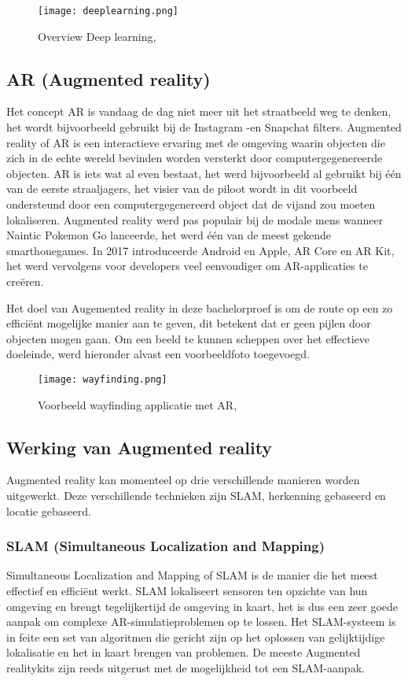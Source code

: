 \begin{figure}[H]
	\centering
	\texttt{[image: deeplearning.png]}
	\caption{Overview Deep learning, \autocite{ObjRec2020}}
\end{figure}

\subsection{AR (Augmented reality)}
Het concept AR is vandaag de dag niet meer uit het straatbeeld weg te denken, het wordt bijvoorbeeld gebruikt bij de Instagram -en Snapchat filters. Augmented reality of AR is een interactieve ervaring met de omgeving waarin objecten die zich in de echte wereld bevinden worden versterkt door computergegenereerde objecten. AR is iets wat al even bestaat, het werd bijvoorbeeld al gebruikt bij één van de eerste straaljagers, het visier van de piloot wordt in dit voorbeeld ondersteund door een computergegenereerd object dat de vijand zou moeten lokaliseren. Augmented reality werd pas populair bij de modale mens wanneer Naintic Pokemon Go lanceerde, het werd één van de meest gekende smarthonegames. In 2017 introduceerde Android en Apple, AR Core en AR Kit, het werd vervolgens voor developers veel eenvoudiger om AR-applicaties te creëren. \autocite{NewGenApps2017}

Het doel van Augemented reality in deze bachelorproef is om de route op een zo efficiënt mogelijke manier aan te geven, dit betekent dat er geen pijlen door objecten mogen gaan. Om een beeld te kunnen scheppen over het effectieve doeleinde, werd hieronder alvast een voorbeeldfoto toegevoegd.

\begin{figure}[H]
	\centering
	\texttt{[image: wayfinding.png]}
	\caption{Voorbeeld wayfinding applicatie met AR, \autocite{MAXST2019}}
\end{figure}

\subsection{Werking van Augmented reality}
Augmented reality kan momenteel op drie verschillende manieren worden uitgewerkt. Deze verschillende technieken zijn SLAM, herkenning gebaseerd en locatie gebaseerd.

\subsubsection{SLAM (Simultaneous Localization and Mapping)}
Simultaneous Localization and Mapping of SLAM is de manier die het meest effectief en efficiënt werkt. SLAM lokaliseert sensoren ten opzichte van hun omgeving en brengt tegelijkertijd de omgeving in kaart, het is dus een zeer goede aanpak om complexe AR-simulatieproblemen op te lossen. Het SLAM-systeem is in feite een set van algoritmen die gericht zijn op het oplossen van gelijktijdige lokalisatie en het in kaart brengen van problemen. De meeste Augmented realitykits zijn reeds uitgerust met de mogelijkheid tot een SLAM-aanpak. \autocite{NewGenApps2017}

